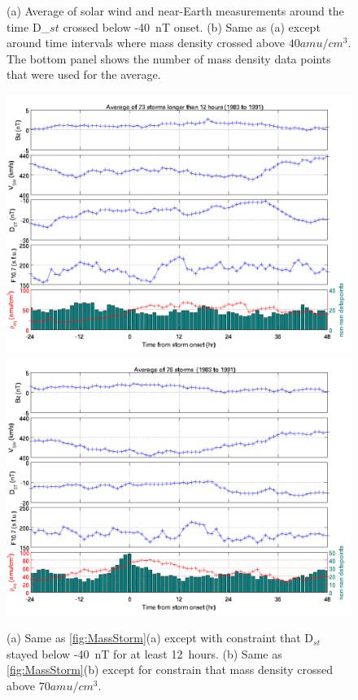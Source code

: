 \documentclass[10pt,twocolumn]{article}
\begin{document}
\begin{figure}[htp!]
\caption{(a) Average of solar wind and near-Earth measurements around the time D_${st}$ crossed below -40~nT onset. (b) Same as (a) except around time intervals where mass density crossed above $40 amu/cm^3$.  The bottom panel shows the number of mass density data points that were used for the average.}
\label{MassStorm}
\end{figure}
\clearpage

\begin{figure}[htp!]
\centering
\includegraphics[scale=0.7]{paperfigures/stormavs-md12.png}
\includegraphics[scale=0.7]{paperfigures/stormavs-m70.png}
\caption{(a) Same as \ref{fig:MassStorm}(a) except with constraint that D$_{st}$ stayed below -40~nT for at least 12~hours. (b) Same as \ref{fig:MassStorm}(b) except for constrain that mass density crossed above $70 amu/cm^3$.}
\label{Mspec}
\end{figure}
\clearpage
\end{document}
